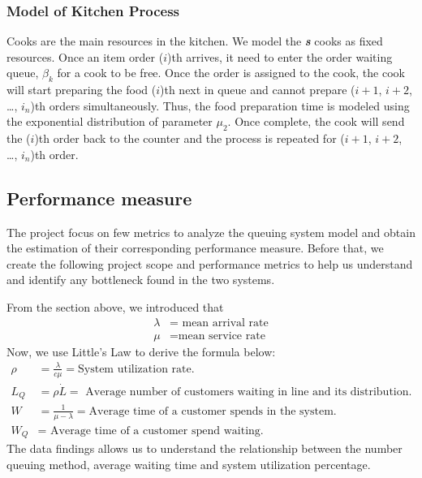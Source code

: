 \subsubsection{Model of Kitchen Process}
Cooks are the main resources in the kitchen. We model the \textit{\textbf{s}} cooks as fixed resources.
Once an item order ($i$)th arrives, it need to enter the order waiting queue, $\beta_{k}$ for a cook to be free.
Once the order is assigned to the cook, the cook will start preparing the food ($i$)th next in queue and cannot  prepare ($i+1$, $i+2$, \dots , $i_n$)th orders simultaneously. Thus, the food preparation time is modeled using the exponential distribution of parameter $\mu_2$.
Once complete, the cook will send the ($i$)th order back to the counter and the process is repeated for ($i+1$, $i+2$, \dots , $i_n$)th order.

\subsection{Performance measure}
The project focus on few metrics to analyze the queuing system model and obtain the estimation of their corresponding performance measure. Before that, we create the following project scope and performance metrics to help us understand and identify any bottleneck found in the two systems.

From the section above, we introduced that
\begin{align*}
    \lambda & =\text{ mean arrival rate} \\
    \mu     & = \text{mean service rate}
\end{align*}
Now, we use Little's Law to derive the formula below:
\begin{align*}
    \rho & = \frac{\lambda}{c\mu} = \text{System utilization rate}.                                  \\
    L_Q  & = \rho \dot L =\text{ Average number of customers waiting in line and its distribution.} \\
    W    & = \frac{1}{\mu - \lambda}=\text{Average time of a customer spends in the system.}        \\
    W_Q  & = \text{ Average time of a customer spend waiting.}
\end{align*}
The data findings allows us to understand the relationship between the number queuing method, average waiting time and system utilization percentage.